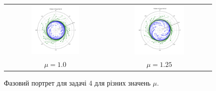 \documentclass{hw_template}
\begin{document}
\begin{figure}
\begin{tabular}{cc}
      \includegraphics[width=0.5\textwidth]{code/problem_4_1.0.pdf} &   \includegraphics[width=0.5\textwidth]{code/problem_4_1.25.pdf} \\
      $\mu=1.0$ & $\mu=1.25$
    \end{tabular}
    \caption{Фазовий портрет для задачі 4 для різних значень $\mu$.}
    \label{fig:with_friction}
\end{figure}
\end{document}
